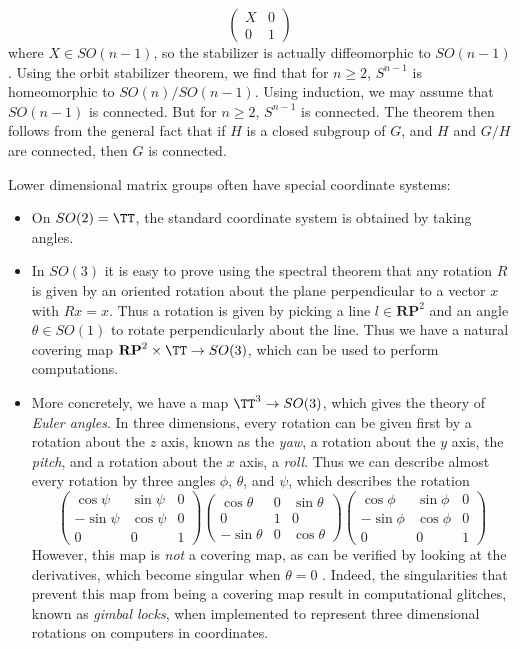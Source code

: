 \begin{example}
    \[ \begin{pmatrix} X & 0 \\ 0 & 1 \end{pmatrix} \]
    where $X \in SO(n-1)$, so the stabilizer is actually diffeomorphic to $SO(n-1)$. Using the orbit stabilizer theorem, we find that for $n \geq 2$, $S^{n-1}$ is homeomorphic to $SO(n)/SO(n-1)$. Using induction, we may assume that $SO(n-1)$ is connected. But for $n \geq 2$, $S^{n-1}$ is connected. The theorem then follows from the general fact that if $H$ is a closed subgroup of $G$, and $H$ and $G/H$ are connected, then $G$ is connected.
\end{example}

Lower dimensional matrix groups often have special coordinate systems:
%
\begin{itemize}
        \item On $SO(2) = \TT$, the standard coordinate system is obtained by taking angles.

        \item In $SO(3)$ it is easy to prove using the spectral theorem that any rotation $R$ is given by an oriented rotation about the plane perpendicular to a vector $x$ with $Rx = x$. Thus a rotation is given by picking a line $l \in \mathbf{RP}^2$ and an angle $\theta \in SO(1)$ to rotate perpendicularly about the line. Thus we have a natural covering map $\mathbf{RP}^2 \times \TT \to SO(3)$, which can be used to perform computations.

        \item More concretely, we have a map $\TT^3 \to SO(3)$, which gives the theory of \emph{Euler angles}. In three dimensions, every rotation can be given first by a rotation about the $z$ axis, known as the \emph{yaw}, a rotation about the $y$ axis, the \emph{pitch}, and a rotation about the $x$ axis, a \emph{roll}. Thus we can describe almost every rotation by three angles $\phi$, $\theta$, and $\psi$, which describes the rotation
        \[ \begin{pmatrix} \cos \psi & \sin \psi & 0 \\ - \sin \psi & \cos \psi & 0 \\ 0 & 0 & 1 \end{pmatrix} \begin{pmatrix} \cos \theta & 0 & \sin \theta \\ 0 & 1 & 0 \\ -\sin \theta & 0 & \cos \theta \end{pmatrix} \begin{pmatrix} \cos \phi & \sin \phi & 0 \\ -\sin \phi & \cos \phi & 0 \\ 0 & 0 & 1 \end{pmatrix} \]
        However, this map is \emph{not} a covering map, as can be verified by looking at the derivatives, which become singular when $\theta = 0$ . Indeed, the singularities that prevent this map from being a covering map result in computational glitches, known as \emph{gimbal locks}, when implemented to represent three dimensional rotations on computers in coordinates.
\end{itemize}
